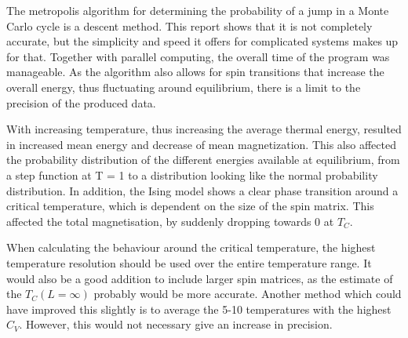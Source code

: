 The metropolis algorithm for determining the probability of a jump in a Monte Carlo cycle is a descent method. This report shows that it is not completely accurate, but the simplicity and speed it offers for complicated systems makes up for that. Together with parallel computing, the overall time of the program was manageable.  As the algorithm also allows for spin transitions that increase the overall energy, thus fluctuating around equilibrium, there is a limit to the precision of the produced data. 

With increasing temperature, thus increasing the average thermal energy, resulted in increased mean energy and decrease of mean magnetization. This also affected the probability distribution of the different energies available at equilibrium, from a step function at T = 1 to a distribution looking like the normal probability distribution. In addition, the Ising model shows a clear phase transition around a critical temperature, which is dependent on the size of the spin matrix. This affected the total magnetisation, by suddenly dropping towards 0 at $ T_C $.

When calculating the behaviour around the critical temperature, the highest temperature resolution should be used over the entire temperature range. It would also be a good addition to include larger spin matrices, as the estimate of the $ T_C(L=\infty) $ probably would be more accurate. Another method which could have improved this slightly is to average the 5-10 temperatures with the highest $ C_V $. However, this would not necessary give an increase in precision.
